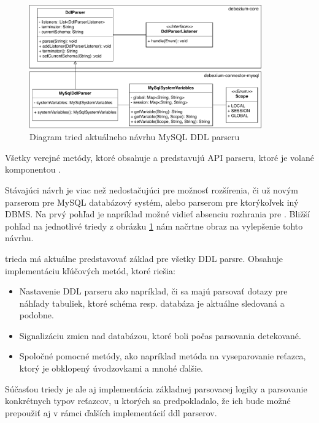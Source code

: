 \begin{figure}[H]
\begin{center}
\includegraphics[width=10cm]{figures/Old_modules.pdf}
\caption{Diagram tried aktuálneho návrhu MySQL DDL parseru}
\label{fig:class_diagram_old}
\end{center}
\end{figure}

Všetky verejné metódy, ktoré obsahuje  a  predstavujú API parseru, ktoré je volané komponentou . 

Stávajúci návrh je viac než nedostačujúci pre možnosť rozšírenia, či už novým parserom pre MySQL databázový systém, alebo parserom pre ktorýkoľvek iný DBMS. Na prvý pohľad je napríklad možné vidieť absenciu rozhrania pre . Bližší pohľad na jednotlivé triedy z obrázku \ref{fig:class_diagram_old} nám načrtne obraz na vylepšenie tohto návrhu.

 trieda má aktuálne predstavovať základ pre všetky DDL parsre. Obsahuje implementáciu kľúčových metód, ktoré riešia: 
\begin{itemize}
\item Nastavenie DDL parseru ako napríklad, či sa majú parsovať dotazy pre náhľady tabuliek, ktoré schéma resp. databáza je aktuálne sledovaná a podobne.
\item Signalizáciu zmien nad databázou, ktoré boli počas parsovania detekované.
\item Spoločné pomocné metódy, ako napríklad metóda na vyseparovanie reťazca, ktorý je obklopený úvodzovkami a mnohé ďalšie.
\end{itemize}

Súčasťou  triedy je ale aj implementácia základnej parsovacej logiky a parsovanie konkrétnych typov reťazcov, u ktorých sa predpokladalo, že ich bude možné prepoužiť aj v rámci ďalších implementácií ddl parserov.

